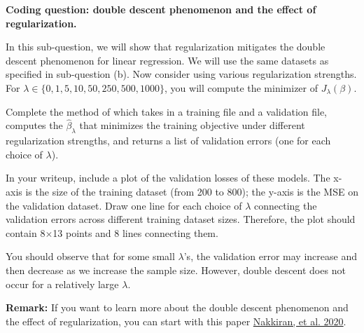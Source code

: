 \item {} \textbf{Coding question: double descent phenomenon and the effect of regularization. }

In this sub-question, we will show that regularization mitigates the double descent phenomenon for linear regression. We will use the same datasets as specified in sub-question (b). Now consider using various regularization strengths. For $\lambda\in \{0, 1, 5, 10, 50, 250, 500, 1000\}$, you will compute the minimizer of $J_\lambda(\beta).$ 

Complete the  method of  which takes in a training file and a validation file, computes the $\hat{\beta}_\lambda$ that minimizes the training objective under different regularization strengths, and returns a list of validation errors (one for each choice of $\lambda$).

In your writeup, include a plot of the validation losses of these models. The x-axis is the size of the training dataset (from 200 to 800); the y-axis is the MSE on the validation dataset. Draw one line for each choice of $\lambda$ connecting the validation errors across different training dataset sizes. Therefore, the plot should contain 8$\times$13 points and 8 lines connecting them. 

You should observe that for some small $\lambda$'s, the validation error may increase and then decrease as we increase the sample size. However, double descent does not occur for a relatively large $\lambda$. 

\textbf{Remark:} If you want to learn more about the double descent phenomenon and the effect of regularization, you can start with this paper \href{https://arxiv.org/abs/2003.01897}{Nakkiran, et al. 2020}.